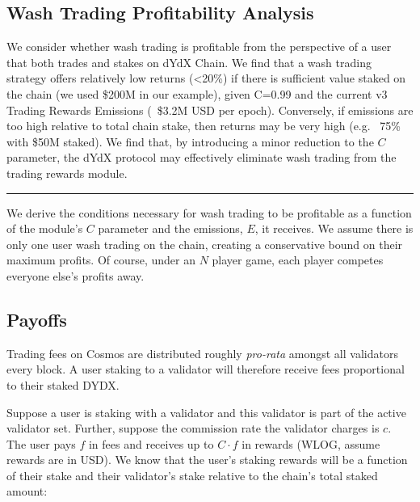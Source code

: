 \begin{fullwidth}
    \section{Wash Trading Profitability Analysis} \label{app:wash}

    \begin{adjustwidth}{2cm}{2cm}
        \justify
        We consider whether wash trading is profitable from the perspective of a user that both trades and stakes on dYdX Chain. We find that a wash trading strategy offers relatively low returns (<20\%) if there is sufficient value staked on the chain (we used \$200M in our example), given C=0.99 and the current v3 Trading Rewards Emissions (~\$3.2M USD per epoch). Conversely, if emissions are too high relative to total chain stake, then returns may be very high (e.g. ~75\% with \$50M staked). We find that, by introducing a minor reduction to the $C$ parameter, the dYdX protocol may effectively eliminate wash trading from the trading rewards module.
    \end{adjustwidth}
    
    \textcolor{gray}{\rule{\linewidth}{0.1mm}}
\end{fullwidth}

    We derive the conditions necessary for wash trading to be profitable as a function of the module's $C$ parameter and the emissions, $E$, it receives. We assume there is only one user wash trading on the chain, creating a conservative bound on their maximum profits. Of course, under an $N$ player game, each player competes everyone else's profits away.

    \subsection{Payoffs}

        Trading fees on Cosmos are distributed roughly \textit{pro-rata} amongst all validators every block. A user staking to a validator will therefore receive fees proportional to their staked DYDX.

        Suppose a user is staking with a validator and this validator is part of the active validator set. Further, suppose the commission rate the validator charges is $c$. The user pays $f$ in fees and receives up to $C\cdot f$ in rewards (WLOG, assume rewards are in USD). We know that the user's staking rewards will be a function of their stake and their validator’s stake relative to the chain’s total staked amount:
        
